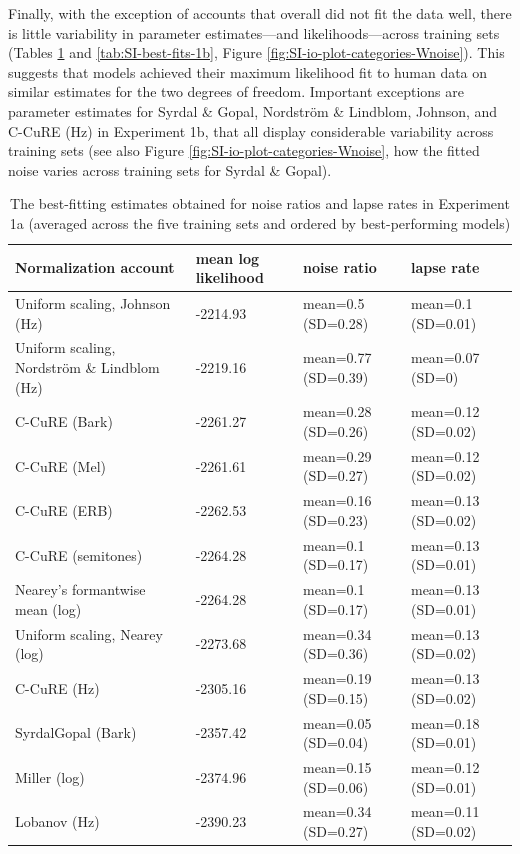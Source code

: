 \documentclass[preprint]{JASA}
\begin{document}
Finally, with the exception of accounts that overall did not fit the data well, there is little variability in parameter estimates---and likelihoods---across training sets (Tables \ref{tab:SI-best-fits-1a} and \ref{tab:SI-best-fits-1b}, Figure \ref{fig:SI-io-plot-categories-Wnoise}). This suggests that models achieved their maximum likelihood fit to human data on similar estimates for the two degrees of freedom. Important exceptions are parameter estimates for Syrdal \& Gopal, Nordström \& Lindblom, Johnson, and C-CuRE (Hz) in Experiment 1b, that all display considerable variability across training sets (see also Figure \ref{fig:SI-io-plot-categories-Wnoise}, how the fitted noise varies across training sets for Syrdal \& Gopal).

\begin{table}
\caption{\label{tab:SI-best-fits-1a}The best-fitting estimates obtained for noise ratios and lapse rates in Experiment 1a (averaged across the five training sets and ordered by best-performing models)}
\small
\centering
\begin{tabular}{p{7cm}p{2cm}p{4cm}p{4cm}}
\toprule
Normalization account & mean log likelihood & noise ratio & lapse rate\\
\midrule
Uniform scaling, Johnson (Hz) & -2214.93 & mean=0.5 (SD=0.28) & mean=0.1 (SD=0.01)\\
Uniform scaling, Nordström \& Lindblom (Hz) & -2219.16 & mean=0.77 (SD=0.39) & mean=0.07 (SD=0)\\
C-CuRE (Bark) & -2261.27 & mean=0.28 (SD=0.26) & mean=0.12 (SD=0.02)\\
C-CuRE (Mel) & -2261.61 & mean=0.29 (SD=0.27) & mean=0.12 (SD=0.02)\\
C-CuRE (ERB) & -2262.53 & mean=0.16 (SD=0.23) & mean=0.13 (SD=0.02)\\
C-CuRE (semitones) & -2264.28 & mean=0.1 (SD=0.17) & mean=0.13 (SD=0.01)\\
Nearey's formantwise mean (log) & -2264.28 & mean=0.1 (SD=0.17) & mean=0.13 (SD=0.01)\\
Uniform scaling, Nearey (log) & -2273.68 & mean=0.34 (SD=0.36) & mean=0.13 (SD=0.02)\\
C-CuRE (Hz) & -2305.16 & mean=0.19 (SD=0.15) & mean=0.13 (SD=0.02)\\
SyrdalGopal (Bark) & -2357.42 & mean=0.05 (SD=0.04) & mean=0.18 (SD=0.01)\\
Miller (log) & -2374.96 & mean=0.15 (SD=0.06) & mean=0.12 (SD=0.01)\\
Lobanov (Hz) & -2390.23 & mean=0.34 (SD=0.27) & mean=0.11 (SD=0.02)\\

\end{tabular}
\end{table}
\end{document}
